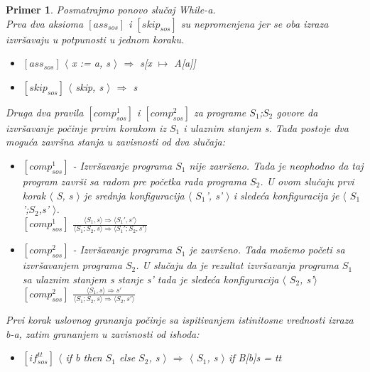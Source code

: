 \documentclass[a4paper]{article}
\newtheorem{primer}{Primer}[section]
\begin{document}
{\begin{primer} Posmatrajmo ponovo slučaj \textit{While-a}.\\
Prva dva aksioma $[ass_{sos}]$ i $[skip_{sos}]$  su nepromenjena jer se oba izraza izvršavaju u potpunosti u jednom koraku.
\begin{itemize}
	\item $[ass_{sos}]$ \hspace{1cm} $\langle$ \textit{x := a, s} $\rangle$ $\Longrightarrow$ \textit{s}[\textit{x $\mapsto$ A}[\textit{a}]]
	\item $[skip_{sos}]$ \hspace{1cm} $\langle$ skip, \textit{s} $\rangle$ $\Longrightarrow$ \textit{s}
\end{itemize} 
Druga dva pravila $[comp^{1}_{sos}]$ i $[comp^{2}_{sos}]$ za programe $S_1$;$S_2$ govore da izvršavanje počinje prvim korakom iz $S_1$ i ulaznim stanjem s. Tada postoje dva moguća završna stanja u zavisnosti od dva slučaja:
\begin{itemize}
	\item $[comp^{1}_{sos}]$ - Izvršavanje programa $S_1$ nije završeno. Tada je neophodno da taj program završi sa radom pre početka rada programa $S_2$. U ovom slučaju prvi korak $\langle$ \textit{S, s} $\rangle$ je srednja konfiguracija  $\langle$ \textit{$S_1$', s'} $\rangle$ i sledeća konfiguracija je  $\langle$ \textit{$S_1$';$S_2$,s'} $\rangle$.\\
	$[comp^1_{sos}]$ \hspace{1cm} {\large $\frac{\langle S_1, s \rangle \Longrightarrow \langle S_1', s' \rangle}{\langle S_1;S_2,s \rangle \Longrightarrow \langle S_1';S_2,s' \rangle}$}
	\item $[comp^2_{sos}]$ - Izvršavanje programa $S_1$  je završeno. Tada možemo početi sa izvršavanjem programa $S_2$. U slučaju da je rezultat izvršavanja programa $S_1$ sa ulaznim stanjem s stanje s' tada je sledeća konfiguracija $\langle$ $S_2$, s'$\rangle$ \\
	$[comp^2_{sos}]$ \hspace{1cm}  {\large $\frac{\langle S_1, s \rangle \Longrightarrow s'}{\langle S_1;S_2,s \rangle \Longrightarrow \langle S_2, s'\rangle}$}
\end{itemize} 
Prvi korak uslovnog grananja počinje sa ispitivanjem istinitosne vrednosti izraza \textit{b}-a, zatim grananjem u zavisnosti od ishoda:
\begin{itemize}
	\item $[if^{tt}_{sos}]$ $\langle$ if b then $S_1$ else $S_2$, s $\rangle$ $\Longrightarrow$ $\langle$ $S_1$, s $\rangle$ \hspace{1cm} if B[b]s = tt

\end{itemize}
\end{primer}}
\end{document}
